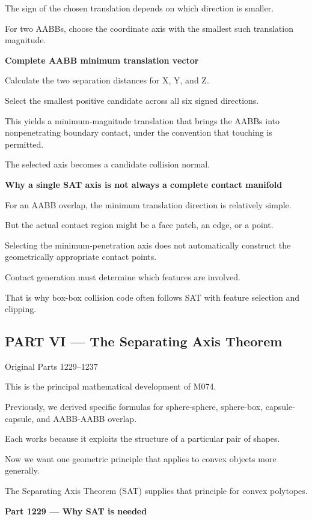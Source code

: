 The sign of the chosen translation depends on which direction is smaller.

For two AABBs, choose the coordinate axis with the smallest such translation magnitude.

\textbf{Complete AABB minimum translation vector}

Calculate the two separation distances for X, Y, and Z.

Select the smallest positive candidate across all six signed directions.

This yields a minimum-magnitude translation that brings the AABBs into nonpenetrating boundary contact, under the convention that touching is permitted.

The selected axis becomes a candidate collision normal.

\textbf{Why a single SAT axis is not always a complete contact manifold}

For an AABB overlap, the minimum translation direction is relatively simple.

But the actual contact region might be a face patch, an edge, or a point.

Selecting the minimum-penetration axis does not automatically construct the geometrically appropriate contact points.

Contact generation must determine which features are involved.

That is why box-box collision code often follows SAT with feature selection and clipping.

\subsection{PART VI --- The Separating Axis Theorem}\label{04-visual-computing-ii-ch024-part-vi-the-separating-axis-theorem}

Original Parts 1229--1237

This is the principal mathematical development of M074.

Previously, we derived specific formulas for sphere-sphere, sphere-box, capsule-capsule, and AABB-AABB overlap.

Each works because it exploits the structure of a particular pair of shapes.

Now we want one geometric principle that applies to convex objects more generally.

The Separating Axis Theorem (SAT) supplies that principle for convex polytopes.

\textbf{Part 1229 --- Why SAT is needed}

